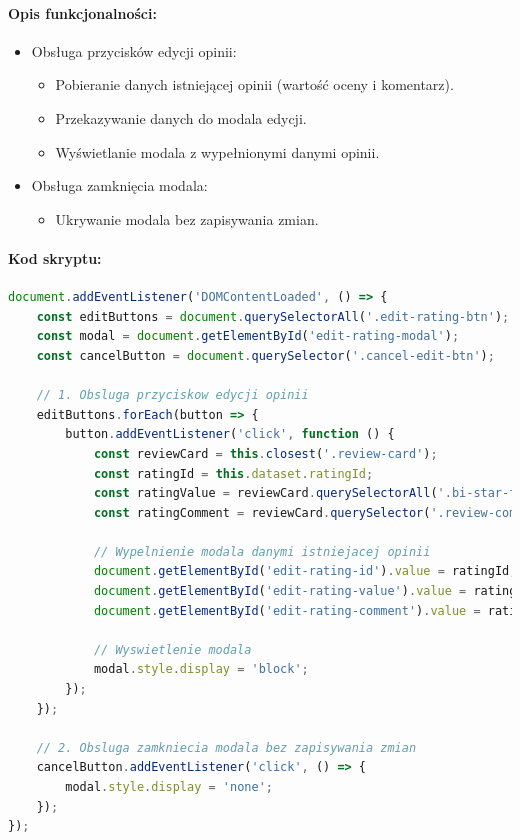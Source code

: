 \documentclass[12pt,a4paper,oneside]{article}
\theoremstyle{definition}
\numberwithin{equation}{section}
\begin{document}
\paragraph{Opis funkcjonalności:}
\begin{itemize}
    \item Obsługa przycisków edycji opinii:
    \begin{itemize}
        \item Pobieranie danych istniejącej opinii (wartość oceny i komentarz).
        \item Przekazywanie danych do modala edycji.
        \item Wyświetlanie modala z wypełnionymi danymi opinii.
    \end{itemize}
    \item Obsługa zamknięcia modala:
    \begin{itemize}
        \item Ukrywanie modala bez zapisywania zmian.
    \end{itemize}
\end{itemize}

\paragraph{Kod skryptu:}
\begin{lstlisting}[language=JavaScript, caption=Fragment \texttt{product\_detail.js}]
document.addEventListener('DOMContentLoaded', () => {
    const editButtons = document.querySelectorAll('.edit-rating-btn');
    const modal = document.getElementById('edit-rating-modal');
    const cancelButton = document.querySelector('.cancel-edit-btn');
    
    // 1. Obsluga przyciskow edycji opinii
    editButtons.forEach(button => {
        button.addEventListener('click', function () {
            const reviewCard = this.closest('.review-card');
            const ratingId = this.dataset.ratingId;
            const ratingValue = reviewCard.querySelectorAll('.bi-star-fill').length;
            const ratingComment = reviewCard.querySelector('.review-comment').innerText;

            // Wypelnienie modala danymi istniejacej opinii
            document.getElementById('edit-rating-id').value = ratingId;
            document.getElementById('edit-rating-value').value = ratingValue;
            document.getElementById('edit-rating-comment').value = ratingComment;

            // Wyswietlenie modala
            modal.style.display = 'block';
        });
    });

    // 2. Obsluga zamkniecia modala bez zapisywania zmian
    cancelButton.addEventListener('click', () => {
        modal.style.display = 'none';
    });
});
\end{lstlisting}
\end{document}
